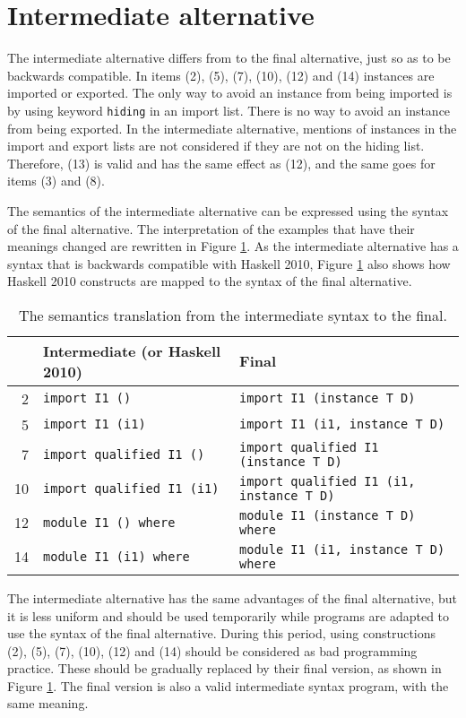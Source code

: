 \documentclass[msc]{ppgccufmg}
\begin{document}
\section{Intermediate alternative}
\label{intermediate}
The intermediate alternative differs from to the final alternative, just so as to be backwards compatible.  In items (2), (5), (7), (10), (12) and (14) instances are
imported or exported.  The only way to avoid an instance from being imported
is by using keyword \texttt{hiding} in an import list.  There is no way to
avoid an instance from being exported.
In the intermediate alternative, mentions of instances in the import and export lists are not considered if they are not on the hiding list.
Therefore, (13) is valid and has the same effect as (12), and the same goes for items (3) and (8).

The semantics of the intermediate alternative can be expressed using the syntax
of the final
alternative.  The interpretation of the examples that have their meanings changed
are rewritten in Figure \ref{tab}.  As the intermediate alternative has a syntax
that is backwards
compatible with Haskell 2010, Figure \ref{tab} also shows how Haskell 2010
constructs are mapped to the syntax of the final alternative.

\begin{table}
\caption{The semantics translation from the intermediate syntax to the
  final.\label{tab}}
\begin{tabular}{|r|l|l|}
\hline
& \textbf{Intermediate (or Haskell 2010)} & \textbf{Final} \\
\hline
2 & \texttt{import I1 ()} & \texttt{import I1 (instance T D)}\\
5 & \texttt{import I1 (i1)} & \texttt{import I1 (i1, instance T D)}\\
7 & \texttt{import qualified I1 ()} & \texttt{import qualified I1 (instance T D)}\\
10 & \texttt{import qualified I1 (i1)} & \texttt{import qualified I1 (i1, instance T D)}\\
12 & \texttt{module I1 () where} & \texttt{module I1 (instance T D) where}\\
14 & \texttt{module I1 (i1) where} & \texttt{module I1 (i1, instance T D)
    where}\\
\hline
\end{tabular}
\end{table}

The intermediate alternative has the same advantages of the final alternative, but it is less
uniform and should be used temporarily while programs are adapted to use
the syntax of the final alternative.  During this period, using constructions (2), (5), (7), (10), (12) and (14)
should be considered as bad programming practice.  These should be gradually
replaced by their final version, as shown in Figure \ref{tab}.  The final
version is also a valid intermediate syntax program, with the same meaning.
\end{document}
